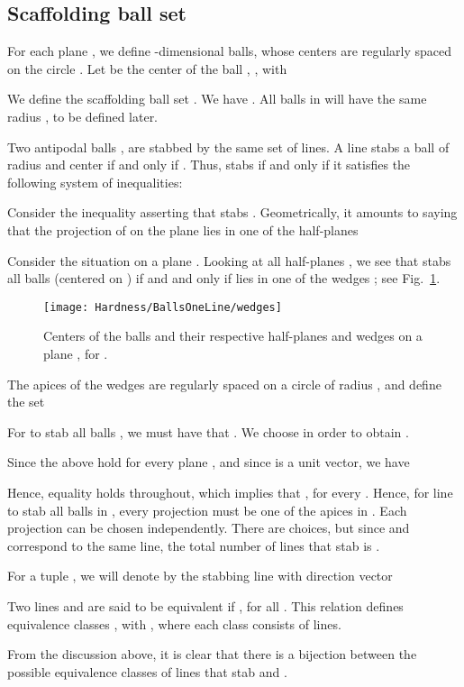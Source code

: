 \documentclass[12pt]{article}
\begin{document}
\subsection{Scaffolding ball set}
\label{scaff}
For each plane , we define  -dimensional balls, 
whose centers  are regularly spaced on the circle .
Let  be the center of the ball , , with  

We define the scaffolding ball set . 
We have . All balls in  will have the same radius , to be defined later.

Two antipodal balls ,  are stabbed by the same set of lines.
A line  stabs a ball  of radius  and center  if and only if . 
Thus,  stabs  if and only if it satisfies the following system of  inequalities:


Consider the inequality asserting that  stabs .
Geometrically, it amounts to saying that
the projection  of  on the plane  lies in one of the half-planes

Consider the situation on a plane .
Looking at all half-planes , we see that 
 stabs all balls  (centered on ) if and and only if  lies in one of the  wedges
; 
see Fig.~\ref{wedges}. 
\begin{figure}
  \centering
	 \texttt{[image: Hardness/BallsOneLine/wedges]}
	 \caption{Centers of the balls and their respective half-planes and wedges on a plane , for .}
	 \label{wedges}
\end{figure}
The apices of the wedges are regularly spaced on a circle of radius 
, 
and define the set 

For  to stab all balls , we must have that .
We choose  in order to obtain .  

Since the above hold for every plane , and since  is a unit vector, 
we have

 Hence, equality holds throughout, which implies that , for every . Hence, for 
line  to stab all balls in , every projection  must be one 
of the  apices in .  Each projection  can be chosen independently. There are  choices, but since  and 
 correspond to the same line, the total number of lines that stab  is . 

For a tuple , we will denote by  the stabbing line with direction vector

Two lines 
and  are said to be equivalent
if , for all . 
This relation defines  equivalence classes , with , 
where each class consists of  lines. 


From the discussion above, it is clear that there is a bijection between the possible equivalence classes of lines that 
stab  and . 
\end{document}

